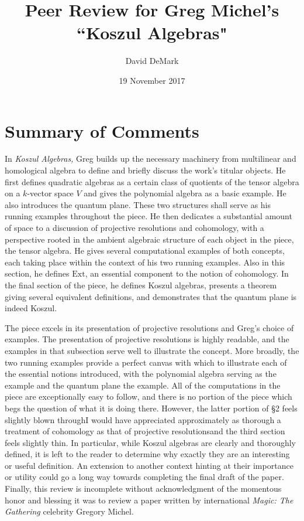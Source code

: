 \documentclass[12pt,letter]{article}
\title{Peer Review for Greg Michel's ``Koszul Algebras"}
\date{19 November 2017}
\author{David DeMark}
\begin{document}
\maketitle\section*{Summary of Comments}
In \emph{Koszul Algebras,} Greg builds up the necessary machinery from multilinear and homological algebra to define and briefly discuss the work's titular objects. He first defines quadratic algebras as a certain class of quotients of the tensor algebra on a $k$-vector space $V$ and gives the polynomial algebra as a basic example. He also introduces the quantum plane. These two structures shall serve as his running examples throughout the piece. He then dedicates a substantial amount of space to a discussion of projective resolutions and cohomology, with a perspective rooted in the ambient algebraic structure of each object in the piece, the tensor algebra. He gives several computational examples of both concepts, each taking place within the context of his two running examples. Also in this section, he defines  $\mathrm{Ext}$, an essential component to the notion of cohomology.  In the final section of the piece, he defines Koszul algebras, presents a theorem giving several equivalent definitions, and demonstrates that the quantum plane is indeed Koszul.

The piece excels in its presentation of projective resolutions and Greg's choice of examples. The presentation of projective resolutions is highly readable, and the examples in that subsection serve well to illustrate the concept. More broadly, the two running examples provide a perfect canvas with which to illustrate each of the essential notions introduced, with the polynomial algebra serving as the  example and the quantum plane the  example. All of the computations in the piece are exceptionally easy to follow, and there is no portion of the piece which begs the question of what it is doing there. However, the latter portion of \S2 feels slightly blown through\textemdash I would have appreciated approximately as thorough a treatment of cohomology as that of projective resolutions\textemdash and the third section feels slightly thin. In particular, while Koszul algebras are clearly and thoroughly defined, it is left to the reader to determine why exactly they are an interesting or useful definition. An extension to another context hinting at their importance or utility could go a long way towards completing the final draft of the paper. Finally, this review is incomplete without acknowledgment of the momentous honor and blessing it was to review a paper written by international \emph{Magic: The Gathering} celebrity Gregory Michel.
\end{document}
